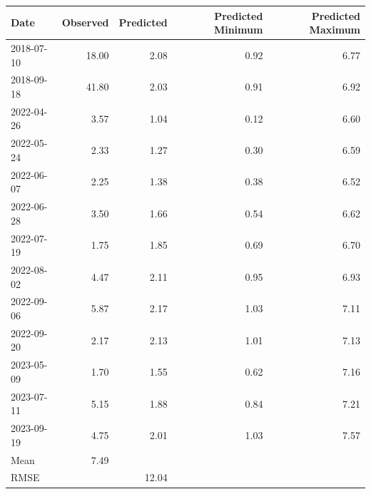 \begin{table}[ht]
\centering
\begin{tabular}{lrrrr}
  \hline
Date & Observed & Predicted & Predicted Minimum & Predicted Maximum \\ 
  \hline
2018-07-10 & 18.00 & 2.08 & 0.92 & 6.77 \\ 
  2018-09-18 & 41.80 & 2.03 & 0.91 & 6.92 \\ 
  2022-04-26 & 3.57 & 1.04 & 0.12 & 6.60 \\ 
  2022-05-24 & 2.33 & 1.27 & 0.30 & 6.59 \\ 
  2022-06-07 & 2.25 & 1.38 & 0.38 & 6.52 \\ 
  2022-06-28 & 3.50 & 1.66 & 0.54 & 6.62 \\ 
  2022-07-19 & 1.75 & 1.85 & 0.69 & 6.70 \\ 
  2022-08-02 & 4.47 & 2.11 & 0.95 & 6.93 \\ 
  2022-09-06 & 5.87 & 2.17 & 1.03 & 7.11 \\ 
  2022-09-20 & 2.17 & 2.13 & 1.01 & 7.13 \\ 
  2023-05-09 & 1.70 & 1.55 & 0.62 & 7.16 \\ 
  2023-07-11 & 5.15 & 1.88 & 0.84 & 7.21 \\ 
  2023-09-19 & 4.75 & 2.01 & 1.03 & 7.57 \\ 
  Mean & 7.49 &  &  &  \\ 
  RMSE &  & 12.04 &  &  \\ 
   \hline
\end{tabular}
\end{table}
